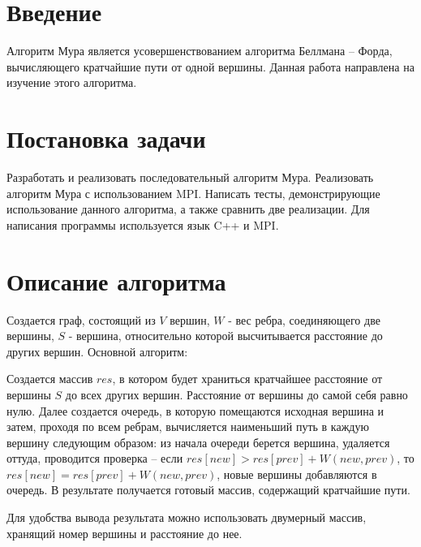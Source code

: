 \documentclass{report}
\begin{document}
\setcounter{page}{2}

\tableofcontents
\newpage

\section*{Введение}
\par Алгоритм Мура является усовершенствованием алгоритма Беллмана – Форда, вычисляющего кратчайшие пути от одной вершины. Данная работа направлена на изучение этого алгоритма.
\newpage

\section*{Постановка задачи}
\par Разработать и реализовать последовательный алгоритм Мура. Реализовать алгоритм Мура с использованием MPI. Написать тесты, демонстрирующие использование данного алгоритма, а также сравнить две реализации. Для написания программы используется язык C++ и MPI.
\newpage

\section*{Описание алгоритма}
\par Создается граф, состоящий из $V$ вершин, $W$ - вес ребра, соединяющего две вершины, $S$ - вершина, относительно которой высчитывается расстояние до других вершин. Основной алгоритм:
\par Создается массив $res$, в котором будет храниться кратчайшее расстояние от вершины $S$ до всех других вершин. Расстояние от вершины до самой себя равно нулю. Далее создается очередь, в которую помещаются исходная вершина и затем, проходя по всем ребрам, вычисляется наименьший путь в каждую вершину следующим образом: из начала очереди берется вершина, удаляется оттуда, проводится проверка – если $res[new]>res[prev]+W(new,prev)$, то $res[new] = res[prev]+W(new,prev)$, новые вершины добавляются в очередь. В результате получается готовый массив, содержащий кратчайшие пути. 
\par Для удобства вывода результата можно использовать двумерный массив, хранящий номер вершины и расстояние до нее.
\newpage

\end{document}
